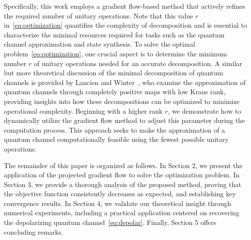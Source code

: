 \documentclass[onefignum,onetabnum]{siamart220329}
\begin{document}
    Specifically, this work employs a gradient flow-based method that actively refines the required number of unitary operations. Note that this value $r$ in~\eqref{eq:optimization} quantifies the complexity of decomposition and is essential to characterize the minimal resources required for tasks such as the quantum channel approximation and state synthesis. To solve the optimal problem~\eqref{eq:optimization}, one crucial aspect is to determine the minimum number $r$ of unitary operations needed for an accurate decomposition. A similar but more theoretical discussion of the minimal decomposition of quantum channels is provided by Lancien and Winter~\cite{Lancien2024}, who examine the approximation of quantum channels through completely positive maps with low Kraus rank, providing insights into how these decompositions can be optimized to minimize operational complexity. 
    Beginning with a higher rank $r$, we demonstrate how to dynamically utilize the gradient flow method to adjust this parameter during the computation process. This approach seeks to make the approximation of a quantum channel computationally feasible using the fewest possible unitary operations.
    
     
    
    The remainder of this paper is organized as follows. In Section 2, we present the application of the projected gradient flow to solve the optimization problem. In Section 3, we provide a thorough analysis of the proposed method, proving that the objective function consistently decreases as expected, and establishing key convergence results. In Section 4, we validate our theoretical insight through numerical experiments, including a practical application centered on recovering the depolarizing quantum channel~\eqref{eq:depolar}. Finally, Section 5 offers concluding remarks.
    
    
    
\end{document}
